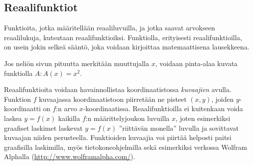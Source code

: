 \subsection*{Reaalifunktiot}

Funktioita, jotka määritellään reaaliluvuilla, ja jotka saavat arvokseen reaalilukuja, kutsutaan reaalifunktioiksi.
Funktiolla, erityisesti reaalifunktioilla, on usein jokin selkeä sääntö, joka voidaan kirjoittaa matemaattisena lausekkeena.

\begin{esimerkki}
	Jos neliön sivun pituutta merkitään muuttujalla $x$, voidaan pinta-alaa kuvata funktiolla $A\colon A(x) = x^2$.
\end{esimerkki} 

Reaalifunktioita voidaan havainnollistaa koordinaatistossa \textit{kuvaajien} avulla.
Funktion $f$ kuvaajassa koordinaatistoon piirretään ne pisteet $(x, y)$, joiden $y$-koordinaatti on $f$:n arvo $x$-koordinaatissa.
Reaalifunktioilla ei kuitenkaan voida laskea $y = f(x)$ kaikilla $f$:n määrittelyjoukon luvuilla $x$, joten esimerkiksi graafiset laskimet
laskevat $y = f(x)$ ''riittävän monella'' luvulla ja sovittavat kuvaajan niiden perusteella.
Funktioiden kuvaajia voi piirtää helposti paitsi graafisilla laskimilla, myös tietokoneohjelmilla sekä esimerkiksi verkossa
Wolfram Alphalla (\url{http://www.wolframalpha.com/}).

\def\vcent#1{\mathsurround0pt$\vcenter{\hbox{#1}}$}


